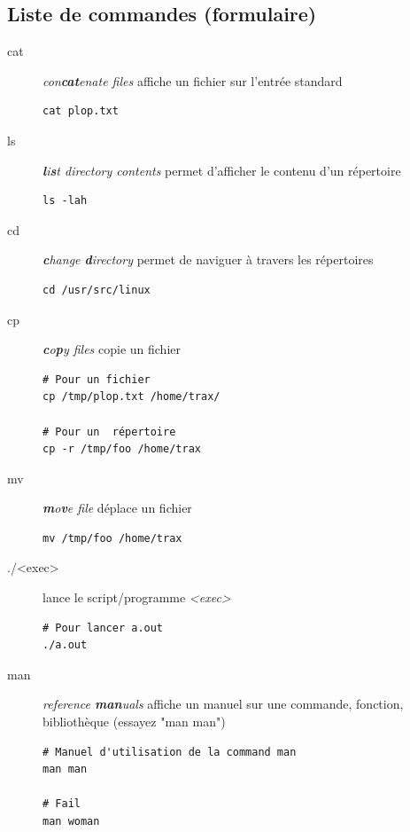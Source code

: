 \documentclass[french, a4paper, 12pt, titlepage]{article}
\begin{document}
\subsection{Liste de commandes (formulaire)}
\begin{description}
\item[cat] \emph{con\textbf{cat}enate files} affiche un fichier sur l'entrée standard
  \begin{lstlisting}
cat plop.txt
  \end{lstlisting}
\item[ls] \emph{\textbf{l}i\textbf{s}t directory contents} permet d'afficher le contenu d'un répertoire
  \begin{lstlisting}
ls -lah 
  \end{lstlisting}
\item[cd] \emph{\textbf{c}hange \textbf{d}irectory} permet de naviguer à travers les répertoires
  \begin{lstlisting}
cd /usr/src/linux    
  \end{lstlisting}
\item[cp] \emph{\textbf{c}o\textbf{p}y files} copie un fichier
  \begin{lstlisting}
# Pour un fichier
cp /tmp/plop.txt /home/trax/

# Pour un  répertoire
cp -r /tmp/foo /home/trax
  \end{lstlisting}
\item[mv] \emph{\textbf{m}o\textbf{v}e file} déplace un fichier
  \begin{lstlisting}
mv /tmp/foo /home/trax    
  \end{lstlisting}
\item[./<exec>] lance le script/programme \emph{<exec>}
  \begin{lstlisting}
# Pour lancer a.out
./a.out    
  \end{lstlisting}
\item[man] \emph{reference \textbf{man}uals} affiche un manuel sur une commande, fonction, bibliothèque (essayez "man man")
  \begin{lstlisting}
# Manuel d'utilisation de la command man
man man

# Fail
man woman
  \end{lstlisting}
\end{description}








\newpage
\end{document}
